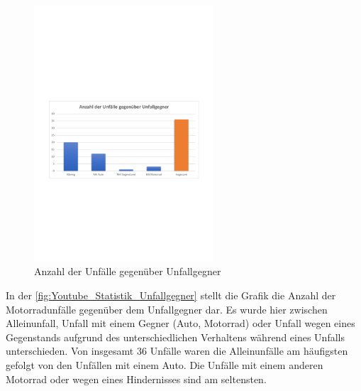 \begin{figure}[htpb]
	\centering
	\includegraphics[width=0.6\textwidth]{Bilder/youtube_Statistik_Unfallgegner.pdf}
	\caption{Anzahl der Unfälle gegenüber Unfallgegner}
	\label{fig:Youtube_Statistik_Unfallgegner}
\end{figure}


In der \autoref{fig:Youtube_Statistik_Unfallgegner} stellt die Grafik die Anzahl der Motorradunfälle gegenüber dem Unfallgegner dar. Es wurde hier zwischen Alleinunfall, Unfall mit einem Gegner (Auto, Motorrad) oder Unfall wegen eines Gegenstands aufgrund des unterschiedlichen Verhaltens während eines Unfalls unterschieden. Von insgesamt 36 Unfälle waren die Alleinunfälle am häufigsten gefolgt von den Unfällen mit einem Auto. Die Unfälle mit einem anderen Motorrad oder wegen eines Hindernisses sind am seltensten.


